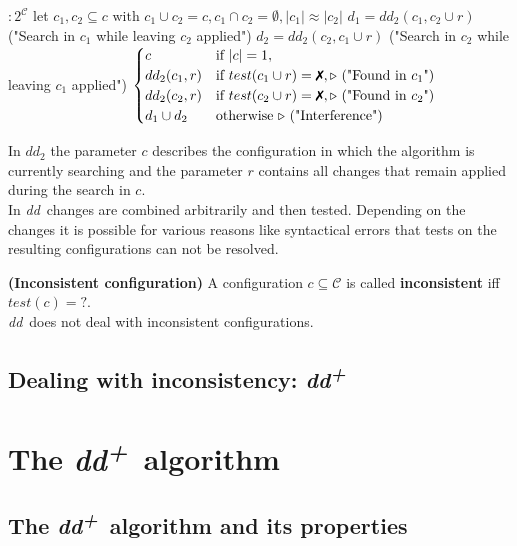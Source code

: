 \documentclass[a4paper,UKenglish]{lipics-v2018}
\newcommand{\dd}[0]{\textit{dd}}
\newcommand{\ddp}{\textit{dd\textsuperscript{+}}}
\newcommand{\C}[0]{\ensuremath{\mathcal{C}}}
\newcommand{\xmark}{\text{\ding{55}}}
\newcommand{\qmark}{\textbf{?}}
\newcommand{\defsub}[1]{\textbf{(#1)} }
\begin{document}
\begin{algorithmic}[1]
	\Function{$dd_2$}{$c,r:2^\C$} $: 2^{\C}$
	\State let $c_1,c_2 \subseteq c \text{ with } c_1 \cup c_2 = c, c_1 \cap c_2 = \emptyset, |c_1| \approx |c_2|$
	\State $d_1 = dd_2(c_1, c_2 \cup r)$ \Comment("Search in $c_1$ while leaving $c_2$ applied")
	\State $d_2 = dd_2(c_2, c_1 \cup r)$ \Comment("Search in $c_2$ while leaving $c_1$ applied")\medskip  
	\State \Return $ \begin{cases}
			c & \text{if } |c|=1, \\
			dd_2(c_1,r) & \text{if } test(c_1 \cup r) = \xmark, \text{\Comment("Found in $c_1$")}\\
			dd_2(c_2,r) & \text{if } test(c_2 \cup r) = \xmark, \text{\Comment("Found in $c_2$")}\\
			d_1 \cup d_2 & \text{otherwise } \text{\Comment("Interference")}
		\end{cases}$
	\EndFunction
\end{algorithmic}

In $dd_2$ the parameter $c$ describes the configuration in which the algorithm is currently searching and the parameter $r$ contains all changes that remain applied during the search in $c$. \\

In \dd\ changes are combined arbitrarily and then tested. Depending on the changes it is possible for various reasons like syntactical errors %
that tests on the resulting configurations can not be resolved. 

 \defsub{Inconsistent configuration} A configuration $c \subseteq \C$ is called \textbf{inconsistent} iff $test(c) = \qmark$.\\

\dd\ does not deal with inconsistent configurations.


\subsection{Dealing with inconsistency: \ddp}



\section{The \ddp\ algorithm}
\subsection{The \ddp\ algorithm and its properties}
\end{document}

